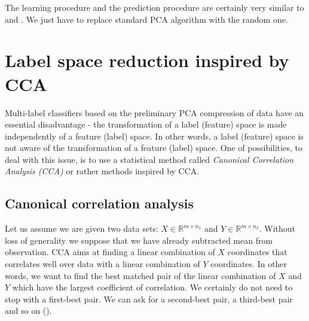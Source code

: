 The learning procedure and the prediction procedure are certainly very similar to  and . We just have to replace standard PCA algorithm with the random one.

\section{Label space reduction inspired by CCA}

Multi-label classifiers based on the preliminary PCA compression of data have an essential disadvantage - the transformation of a label (feature) space is made independently of a feature (label) space. In other words, a label (feature) space is not aware of the transformation of a feature (label) space. One of possibilities, to deal with this issue, is to use a statistical method called \textit{Canonical Correlation Analysis (\textit{CCA})} or rather methods inspired by CCA.   

\subsection{Canonical correlation analysis}

Let us assume we are given two data sets: $X \in \mathbb{R}^{m \times n_1}$ and $Y \in \mathbb{R}^{m \times n_2}$. Without loss of generality we suppose that we have already subtracted mean from observation. CCA aims at finding a linear combination of $X$ coordinates that correlates well over data with a linear combination of $Y$ coordinates. In other words, we want to find the best matched pair of the linear combination of $X$ and $Y$ which have the largest coefficient of correlation. We certainly do not need to stop with a first-best pair. We can ask for a second-best pair, a third-best pair and so on (\cite{William}).

